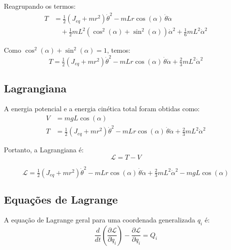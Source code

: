 \documentclass[9pt,a4paper,twocolumn,twoside]{tau-class/tau}
\begin{document}
Reagrupando os termos:
\begin{align}
    T &= \tfrac{1}{2}(J_{eq} + m r^2) \dot{\theta}^2 
        - m L r \cos(\alpha) \, \dot{\theta}\dot{\alpha} \nonumber \\
      &\quad + \tfrac{1}{2} m L^2 (\cos^2(\alpha) + \sin^2(\alpha))\dot{\alpha}^2
        + \tfrac{1}{6} m L^2 \dot{\alpha}^2
    \label{eq:Ttotal3}
\end{align}

Como $\cos^2(\alpha) + \sin^2(\alpha) = 1$, temos:
\begin{equation}
    T = \tfrac{1}{2}(J_{eq} + m r^2) \dot{\theta}^2 
        - m L r \cos(\alpha) \, \dot{\theta}\dot{\alpha} 
        + \tfrac{2}{3} m L^2 \dot{\alpha}^2
    \label{eq:TtotalFinal}
\end{equation}


\subsection{Lagrangiana}

A energia potencial e a energia cinética total foram obtidas como:
\begin{align}
    V &= m g L \cos(\alpha) \\
    T &= \tfrac{1}{2}(J_{eq} + m r^2)\dot{\theta}^2 
        - m L r \cos(\alpha)\,\dot{\theta}\dot{\alpha}
        + \tfrac{2}{3} m L^2 \dot{\alpha}^2
\end{align}

Portanto, a Lagrangiana é:
\begin{equation}
    \mathcal{L} = T - V
\end{equation}

\begin{equation}
    \mathcal{L} = \tfrac{1}{2}(J_{eq} + m r^2)\dot{\theta}^2
        - m L r \cos(\alpha)\,\dot{\theta}\dot{\alpha}
        + \tfrac{2}{3} m L^2 \dot{\alpha}^2
        - m g L \cos(\alpha)
\end{equation}

\subsection{Equações de Lagrange}

A equação de Lagrange geral para uma coordenada generalizada $q_i$ é:
\begin{equation}
    \frac{d}{dt}\left(\frac{\partial \mathcal{L}}{\partial \dot{q}_i}\right)
    - \frac{\partial \mathcal{L}}{\partial q_i} = Q_i
\end{equation}
\end{document}
